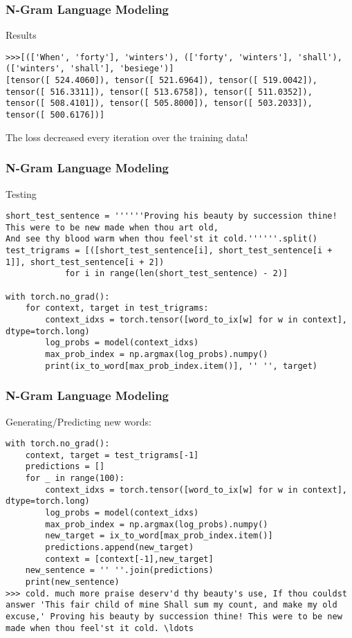 \begin{frame}[fragile]
\frametitle{N-Gram Language Modeling}
Results 
 \begin{lstlisting}
>>>[(['When', 'forty'], 'winters'), (['forty', 'winters'], 'shall'), (['winters', 'shall'], 'besiege')]
[tensor([ 524.4060]), tensor([ 521.6964]), tensor([ 519.0042]), tensor([ 516.3311]), tensor([ 513.6758]), tensor([ 511.0352]), tensor([ 508.4101]), tensor([ 505.8000]), tensor([ 503.2033]), tensor([ 500.6176])]
\end{lstlisting}     
The loss decreased every iteration over the training data!
\end{frame} 

\begin{frame}[fragile]
\frametitle{N-Gram Language Modeling}
Testing 
 \begin{lstlisting}
short_test_sentence = ''''''Proving his beauty by succession thine!
This were to be new made when thou art old,
And see thy blood warm when thou feel'st it cold.''''''.split()
test_trigrams = [([short_test_sentence[i], short_test_sentence[i + 1]], short_test_sentence[i + 2])
            for i in range(len(short_test_sentence) - 2)]

with torch.no_grad():
    for context, target in test_trigrams:
        context_idxs = torch.tensor([word_to_ix[w] for w in context], dtype=torch.long)
        log_probs = model(context_idxs)
        max_prob_index = np.argmax(log_probs).numpy()
        print(ix_to_word[max_prob_index.item()], '' '', target)
\end{lstlisting}     
\end{frame} 

\begin{frame}[fragile]
\frametitle{N-Gram Language Modeling}
Generating/Predicting new words: 
 \begin{lstlisting}
with torch.no_grad():
    context, target = test_trigrams[-1]
    predictions = []
    for _ in range(100):
        context_idxs = torch.tensor([word_to_ix[w] for w in context], dtype=torch.long)
        log_probs = model(context_idxs)
        max_prob_index = np.argmax(log_probs).numpy()
        new_target = ix_to_word[max_prob_index.item()]
        predictions.append(new_target) 
        context = [context[-1],new_target]
    new_sentence = '' ''.join(predictions)
    print(new_sentence)
>>> cold. much more praise deserv'd thy beauty's use, If thou couldst answer 'This fair child of mine Shall sum my count, and make my old excuse,' Proving his beauty by succession thine! This were to be new made when thou feel'st it cold. \ldots
\end{lstlisting}     
\end{frame} 


